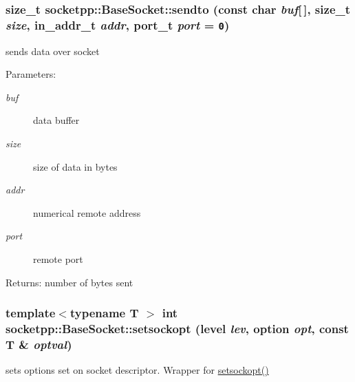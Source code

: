 \begin{CompactItemize}
{\subsubsection[{sendto}]{\setlength{\rightskip}{0pt plus 5cm}size\_\-t socketpp::BaseSocket::sendto (const char {\em buf}\mbox{[}$\,$\mbox{]}, \/  size\_\-t {\em size}, \/  in\_\-addr\_\-t {\em addr}, \/  {\bf port\_\-t} {\em port} = {\tt 0})}}
\label{classsocketpp_1_1BaseSocket_33ef257bb6eb0f23ae0680df57738f3a}


sends data over socket 

\begin{Desc}
\item[Parameters:]
\begin{description}
\item[{\em buf}]data buffer \item[{\em size}]size of data in bytes \item[{\em addr}]numerical remote address \item[{\em port}]remote port \end{description}
\end{Desc}
\begin{Desc}
\item[Returns:]number of bytes sent \end{Desc}
\hypertarget{classsocketpp_1_1BaseSocket_3f1f168e4953c046bb1159941da2fa30}{
\subsubsection[{setsockopt}]{\setlength{\rightskip}{0pt plus 5cm}template$<$typename T $>$ int socketpp::BaseSocket::setsockopt ({\bf level} {\em lev}, \/  {\bf option} {\em opt}, \/  const T \& {\em optval})}}
\label{classsocketpp_1_1BaseSocket_3f1f168e4953c046bb1159941da2fa30}


sets options set on socket descriptor. Wrapper for \hyperlink{classsocketpp_1_1BaseSocket_3f1f168e4953c046bb1159941da2fa30}{setsockopt()} 


\end{CompactItemize}
